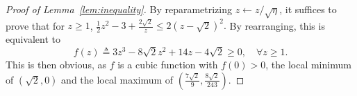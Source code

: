 \begin{proof}[Proof of Lemma~\ref{lem:inequality}]
    By reparametrizing $z \gets z / \sqrt{\eta}$, it suffices to prove that for $z \geq 1$, $\frac{1}{2} z^2 - 3 + \frac{2\sqrt{2}}{z} \leq 2 \left( z - \sqrt{2} \right)^2.$
    By rearranging, this is equivalent to
    \begin{equation*}
        f(z) \triangleq 3z^3 - 8\sqrt{2} z^2 + 14z - 4\sqrt{2} \geq 0, \quad \forall z \geq 1.
    \end{equation*}
    This is then obvious, as $f$ is a cubic function with $f(0) > 0$, the local minimum of $(\sqrt{2}, 0)$ and the local maximum of $\left( \frac{7\sqrt{2}}{9}, \frac{8\sqrt{2}}{243} \right)$.
\end{proof}
\newpage


























    

